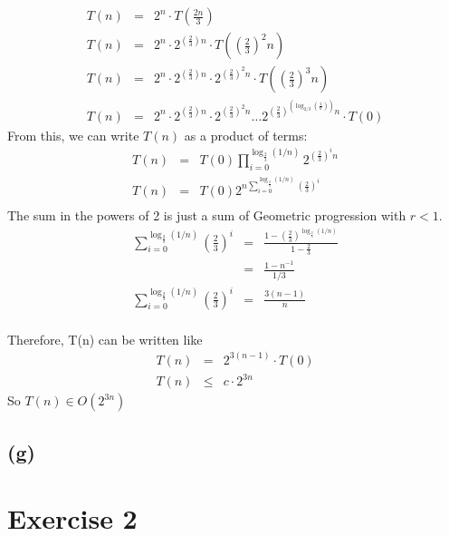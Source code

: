\documentclass[a4paper,12pt]{article} %
\begin{document}
\begin{eqnarray*}
    T(n) &=& 2^n \cdot T \left(\frac{2n}{3}\right) \\
    T(n) &=& 2^n \cdot 2^{\left(\frac{2}{3}\right) n} \cdot T\left(\left(\frac{2}{3}\right)^2 n\right)\\
    T(n) &=& 2^n \cdot 2^{\left(\frac{2}{3}\right)n} \cdot 2^{\left(\frac{2}{3}\right)^2 n }\cdot T\left(\left(\frac{2}{3}\right)^3 n\right)\\
    T(n) &=& 2^n \cdot 2^{\left(\frac{2}{3}\right)n} \cdot 2^{\left(\frac{2}{3}\right)^2 n } \dots  2^{\left(\frac{2}{3}\right)^{\left(\log_{2/3}\left(\frac{1}{n}\right)\right)} n}\cdot T(0)
\end{eqnarray*}
From this, we can write $T(n)$ as a product of terms:
\begin{eqnarray*}
    T(n) &=& T(0)\prod_{i=0}^{\log_{\frac{2}{3}}(1/n)}2^{\left(\frac{2}{3}\right)^i n}\\
    T(n) &=& T(0)2^{n\sum_{i = 0}^{\log_{\frac{2}{3}}(1/n)}\left(\frac{2}{3}\right)^i}\\
\end{eqnarray*}
The sum in the powers of 2 is just a sum of Geometric progression with $r<1$.\\
\begin{eqnarray*}
    \sum_{i = 0}^{\log_{\frac{2}{3}}(1/n)}\left(\frac{2}{3}\right)^i &=& \frac{1 - \left(\frac{2}{3}\right)^{\log_{\frac{2}{3}}(1/n)}}{1 - \frac{2}{3}}\\
    &=& \frac{1 - n^{-1}}{1/3}\\
    \sum_{i = 0}^{\log_{\frac{2}{3}}(1/n)}\left(\frac{2}{3}\right)^i &=& \frac{3(n-1)}{n}\\
\end{eqnarray*}

Therefore, T(n) can be written like \\
\begin{eqnarray*}
    T(n) &=& 2^{3(n-1)}\cdot T(0) \\
    T(n) &\leq& c \cdot 2^{3n}
\end{eqnarray*}
So $T(n) \in O(2^{3n})$

\subsection*{(g)}
 


\section*{Exercise 2}
\end{document}
